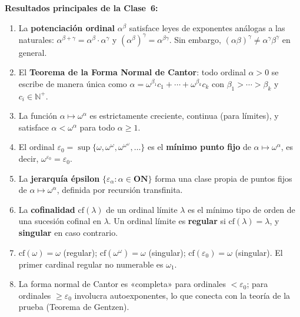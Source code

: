 \begin{importante}
\textbf{Resultados principales de la Clase~6:}
\begin{enumerate}[leftmargin=2em, label=\textbf{\arabic*.}]
  \item La \textbf{potenciación ordinal} $\alpha^\beta$ satisface leyes de exponentes análogas a las naturales: $\alpha^{\beta+\gamma} = \alpha^\beta \cdot \alpha^\gamma$ y $(\alpha^\beta)^\gamma = \alpha^{\beta\gamma}$. Sin embargo, $(\alpha\beta)^\gamma \neq \alpha^\gamma \beta^\gamma$ en general.

  \item El \textbf{Teorema de la Forma Normal de Cantor}: todo ordinal $\alpha > 0$ se escribe de manera única como $\alpha = \omega^{\beta_1}c_1 + \cdots + \omega^{\beta_k}c_k$ con $\beta_1 > \cdots > \beta_k$ y $c_i \in \mathbb{N}^+$.

  \item La función $\alpha \mapsto \omega^\alpha$ es estrictamente creciente, continua (para límites), y satisface $\alpha < \omega^\alpha$ para todo $\alpha \geq 1$.

  \item El ordinal $\varepsilon_0 = \sup\{\omega, \omega^\omega, \omega^{\omega^\omega}, \ldots\}$ es el \textbf{mínimo punto fijo} de $\alpha \mapsto \omega^\alpha$, es decir, $\omega^{\varepsilon_0} = \varepsilon_0$.

  \item La \textbf{jerarquía épsilon} $\{\varepsilon_\alpha : \alpha \in \mathbf{ON}\}$ forma una clase propia de puntos fijos de $\alpha \mapsto \omega^\alpha$, definida por recursión transfinita.

  \item La \textbf{cofinalidad} $\mathrm{cf}(\lambda)$ de un ordinal límite $\lambda$ es el mínimo tipo de orden de una sucesión cofinal en $\lambda$. Un ordinal límite es \textbf{regular} si $\mathrm{cf}(\lambda) = \lambda$, y \textbf{singular} en caso contrario.

  \item $\mathrm{cf}(\omega) = \omega$ (regular); $\mathrm{cf}(\omega^\omega) = \omega$ (singular); $\mathrm{cf}(\varepsilon_0) = \omega$ (singular). El primer cardinal regular no numerable es $\omega_1$.

  \item La forma normal de Cantor es «completa» para ordinales $< \varepsilon_0$; para ordinales $\geq \varepsilon_0$ involucra autoexponentes, lo que conecta con la teoría de la prueba (Teorema de Gentzen).
\end{enumerate}
\end{importante}

